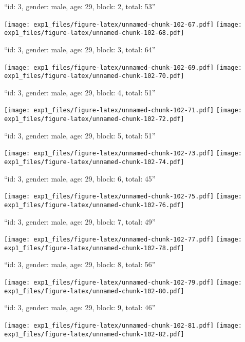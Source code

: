 \documentclass[11pt,,]{article}
\begin{document}
\newpage
[1] 

``id: 3, gender: male, age: 29, block: 2, total: 53''

\texttt{[image: exp1\_files/figure-latex/unnamed-chunk-102-67.pdf]}
\texttt{[image: exp1\_files/figure-latex/unnamed-chunk-102-68.pdf]}

\newpage
[1] 

``id: 3, gender: male, age: 29, block: 3, total: 64''

\texttt{[image: exp1\_files/figure-latex/unnamed-chunk-102-69.pdf]}
\texttt{[image: exp1\_files/figure-latex/unnamed-chunk-102-70.pdf]}

\newpage
[1] 

``id: 3, gender: male, age: 29, block: 4, total: 51''

\texttt{[image: exp1\_files/figure-latex/unnamed-chunk-102-71.pdf]}
\texttt{[image: exp1\_files/figure-latex/unnamed-chunk-102-72.pdf]}

\newpage
[1] 

``id: 3, gender: male, age: 29, block: 5, total: 51''

\texttt{[image: exp1\_files/figure-latex/unnamed-chunk-102-73.pdf]}
\texttt{[image: exp1\_files/figure-latex/unnamed-chunk-102-74.pdf]}

\newpage
[1] 

``id: 3, gender: male, age: 29, block: 6, total: 45''

\texttt{[image: exp1\_files/figure-latex/unnamed-chunk-102-75.pdf]}
\texttt{[image: exp1\_files/figure-latex/unnamed-chunk-102-76.pdf]}

\newpage
[1] 

``id: 3, gender: male, age: 29, block: 7, total: 49''

\texttt{[image: exp1\_files/figure-latex/unnamed-chunk-102-77.pdf]}
\texttt{[image: exp1\_files/figure-latex/unnamed-chunk-102-78.pdf]}

\newpage
[1] 

``id: 3, gender: male, age: 29, block: 8, total: 56''

\texttt{[image: exp1\_files/figure-latex/unnamed-chunk-102-79.pdf]}
\texttt{[image: exp1\_files/figure-latex/unnamed-chunk-102-80.pdf]}

\newpage
[1] 

``id: 3, gender: male, age: 29, block: 9, total: 46''

\texttt{[image: exp1\_files/figure-latex/unnamed-chunk-102-81.pdf]}
\texttt{[image: exp1\_files/figure-latex/unnamed-chunk-102-82.pdf]}
\end{document}
